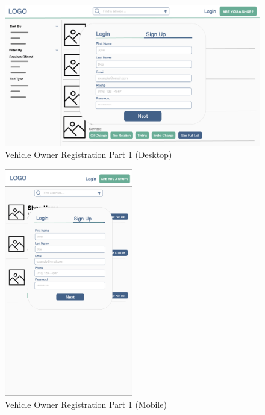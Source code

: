 \documentclass[12pt, titlepage]{article}
\begin{document}
\begin{figure}[H]
	\centering
	\includegraphics[width=\textwidth]{mockups/Vehicle Owner Sign Up (Part 1) (Desktop).png}
	\caption{Vehicle Owner Registration \textemdash{} Part 1 (Desktop)}
\end{figure}

\begin{figure}[H]
	\centering
	\includegraphics[width=0.5\textwidth]{mockups/Vehicle Owner Sign Up (Part 1) (Mobile).png}
	\caption{Vehicle Owner Registration \textemdash{} Part 1 (Mobile)}
\end{figure}
\end{document}
